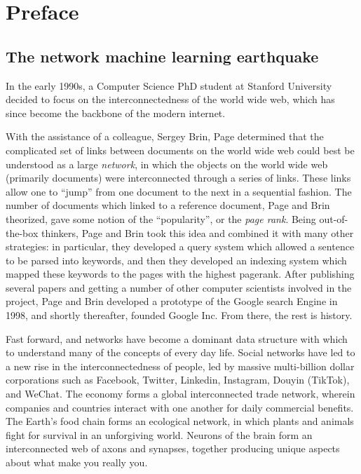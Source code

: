 \chapter*{Preface}

\section*{The network machine learning earthquake}

In the early 1990s, a Computer Science PhD student at Stanford University decided to focus on the interconnectedness of the world wide web, which has since become the backbone of the modern internet.

With the assistance of a colleague, Sergey Brin, Page determined that the complicated set of links between documents on the world wide web could best be understood as a large \textit{network}, in which the objects on the world wide web (primarily documents) were interconnected through a series of links. These links allow one to ``jump'' from one document to the next in a sequential fashion. The number of documents which linked to a reference document, Page and Brin theorized, gave some notion of the ``popularity'', or the \textit{page rank}. Being out-of-the-box thinkers, Page and Brin took this idea and combined it with many other strategies: in particular, they developed a query system which allowed a sentence to be parsed into keywords, and then they developed an indexing system which mapped these keywords to the pages with the highest pagerank. After publishing several papers and getting a number of other computer scientists involved in the project, Page and Brin developed a prototype of the Google search Engine in 1998, and shortly thereafter, founded Google Inc. From there, the rest is history.

Fast forward, and networks have become a dominant data structure with which to understand many of the concepts of every day life. Social networks have led to a new rise in the interconnectedness of people, led by massive multi-billion dollar corporations such as Facebook, Twitter, Linkedin, Instagram, Douyin (TikTok), and WeChat. The economy forms a global interconnected trade network, wherein companies and countries interact with one another for daily commercial benefits. The Earth's food chain forms an ecological network, in which plants and animals fight for survival in an unforgiving world. Neurons of the brain form an interconnected web of axons and synapses, together producing unique aspects about what make you really you. 

